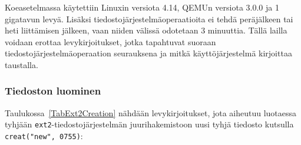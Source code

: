 Koeasetelmassa käytettiin Linuxin versiota 4.14, QEMUn versiota 3.0.0 ja 1 gigatavun levyä.
Lisäksi tiedostojärjestelmäoperaatioita ei tehdä peräjälkeen tai heti liittämisen jälkeen,
vaan niiden välissä odotetaan 3 minuuttia.
Tällä lailla voidaan erottaa levykirjoitukset,
jotka tapahtuvat suoraan tiedostojärjestelmäoperaation seurauksena
ja mitkä käyttöjärjestelmä kirjoittaa taustalla. 

\subsubsection{Tiedoston luominen}
\label{ChapExt2FileCreation}
Taulukossa~\ref{TabExt2Creation} nähdään levykirjoitukset,
jota aiheutuu luotaessa tyhjään \texttt{ext2}-tiedostojärjestelmän juurihakemistoon uusi tyhjä tiedosto kutsulla \texttt{creat("new", 0755)}:



%

